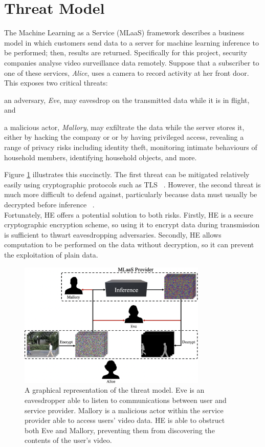 \section{Threat Model}
\label{sec:threatModel}
\indent \indent
The Machine Learning as a Service (MLaaS) framework describes a business model in which customers send data to a server for machine learning inference to be performed; then, results are returned. Specifically for this project, security companies analyse video surveillance data remotely. Suppose that a subscriber to one of these services, \textit{Alice}, uses a camera to record activity at her front door. This exposes two critical threats: 
\begin{enumerate*}[label=$(\roman*)$]
    \item an adversary, \textit{Eve}, may eavesdrop on the transmitted data while it is in flight, and
    \item a malicious actor, \textit{Mallory}, may exfiltrate the data while the server stores it, either by hacking the company or or by having privileged access, revealing a range of privacy risks including identity theft, monitoring intimate behaviours of household members, identifying household objects, and more.
\end{enumerate*}
Figure \ref{fig:threatModel} illustrates this succinctly. The first threat can be mitigated relatively easily using cryptographic protocols such as TLS ~\cite{TLS}. However, the second threat is much more difficult to defend against, particularly because data must usually be decrypted before inference ~\cite{Bae}. 
\smallskip \\ \indent
Fortunately, HE offers a potential solution to both risks. Firstly, HE is a secure cryptographic encryption scheme, so using it to encrypt data during transmission is sufficient to thwart eavesdropping adversaries. Secondly, HE allows computation to be performed on the data without decryption, so it can prevent the exploitation of plain data. 
\begin{figure}[h!]
    \centering
    \includegraphics[width=0.8\textwidth]{figures/threatModel}
    \caption[The Threat Model]{A graphical representation of the threat model. Eve is an eavesdropper able to listen to communications between user and service provider. Mallory is a malicious actor within the service provider able to access users' video data. HE is able to obstruct both Eve and Mallory, preventing them from discovering the contents of the user's video.}
    \label{fig:threatModel}
\end{figure}

